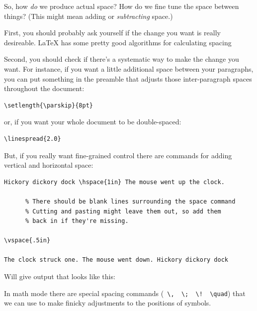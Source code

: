 So, how {\em do} we produce actual space?  How do we fine tune the space between things?  (This might mean adding or {\em subtracting} space.)

First, you should probably ask yourself if the change you want is really desireable.  \LaTeX{}  has some pretty good algorithms for calculating spacing\textellipsis

Second, you should check if there's a systematic way to make the change you want.  For instance, if you want a little additional space between your paragraphs, you can put something in the preamble that adjusts those inter-paragraph spaces throughout the document:

\begin{codeblock}
\begin{verbatim}
\setlength{\parskip}{8pt}
\end{verbatim}
\end{codeblock}

\noindent or, if you want your whole document to be double-spaced:

\begin{codeblock}
\begin{verbatim}
\linespread{2.0}
\end{verbatim}
\end{codeblock}

But, if you really want fine-grained control there are commands for adding vertical and horizontal space:

\begin{codeblock}
\begin{verbatim}
Hickory dickory dock \hspace{1in} The mouse went up the clock.

      % There should be blank lines surrounding the space command              
      % Cutting and pasting might leave them out, so add them
      % back in if they're missing.

\vspace{.5in}
                
The clock struck one. The mouse went down. Hickory dickory dock
\end{verbatim}
\end{codeblock}

Will give output that looks like this:

\begin{center}
\end{center}

In math mode there are special spacing commands (\verb+ \,  \;  \!  \quad+) that we can use to make finicky adjustments to the positions of symbols.  


